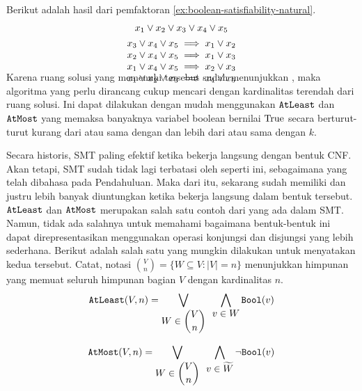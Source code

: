 \begin{example}
	Berikut adalah hasil dari pemfaktoran \autoref{ex:boolean-satisfiability-natural}.
	\[
		\smash[b]{
		\begin{array}{c}
			x_1 \vee x_2 \vee x_3 \vee x_4 \vee x_5 \\ [4pt]
			x_3 \vee x_4 \vee x_5 \implies x_1 \vee x_2 \\
			x_2 \vee x_4 \vee x_5 \implies x_1 \vee x_3 \\
			x_1 \vee x_4 \vee x_5 \implies x_2 \vee x_3 \\
			x_1 \vee x_2 \vee x_3 \implies x_4 \vee x_5
		\end{array}
		}
	\]
	\label{ex:boolean-satisfiability}
\end{example}

Karena ruang solusi  yang memenuhi  tersebut sudah menunjukkan , maka algoritma yang perlu dirancang cukup mencari  dengan kardinalitas terendah dari ruang solusi. Ini dapat dilakukan dengan mudah menggunakan  \(\mathtt{AtLeast}\) dan \(\mathtt{AtMost}\) yang memaksa banyaknya variabel boolean bernilai \(\mathrm{True}\) secara berturut-turut kurang dari atau sama dengan dan lebih dari atau sama dengan \(k\).

Secara historis, SMT paling efektif ketika bekerja langsung dengan bentuk CNF. Akan tetapi, SMT  sudah tidak lagi terbatasi oleh  seperti ini, sebagaimana yang telah dibahasa pada Pendahuluan. Maka dari itu,  sekarang sudah memiliki  dan justru lebih banyak diuntungkan ketika bekerja langsung dalam bentuk tersebut.  \(\mathtt{AtLeast}\) dan \(\mathtt{AtMost}\) merupakan salah satu contoh dari  yang ada dalam SMT. Namun, tidak ada salahnya untuk memahami bagaimana bentuk-bentuk ini dapat direpresentasikan menggunakan operasi konjungsi dan disjungsi yang lebih sederhana. Berikut adalah salah satu  yang mungkin dilakukan untuk menyatakan kedua  tersebut. Catat, notasi \(\displaystyle \binom{V}{n} = \{W \subseteq V : |V| = n\}\) menunjukkan himpunan yang memuat seluruh himpunan bagian \(V\) dengan kardinalitas \(n\).
\[
	\mathtt{AtLeast}(V, n) = \displaystyle \bigvee \limits_{\displaystyle W \in \binom{V}{n}} \enspace \bigwedge \limits_{\displaystyle v \in W} \mathtt{Bool}(v)
\]

\[
	\mathtt{AtMost}(V, n) = \displaystyle \bigvee \limits_{\displaystyle W \in \binom{V}{n}} \enspace \bigwedge \limits_{\displaystyle v \in \widetilde{W}} \neg \mathtt{Bool}(v)
\]

